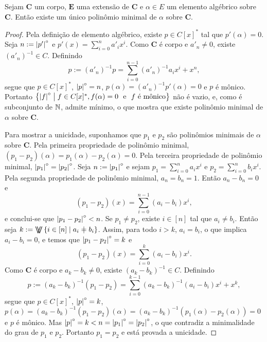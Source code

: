 \begin{proposition}
	Sejam $\bm C$ um corpo, $\bm E$ uma extensão de $\bm C$ e $\alpha \in E$ um elemento algébrico sobre $\bm C$. Então existe um único polinômio minimal de $\alpha$ sobre $\bm C$.
\end{proposition}
\begin{proof}
	Pela definição de elemento algébrico, existe $p \in C[x]^*$ tal que $p'(\alpha)=0$. Seja $n := \left\vert{p'}\right\vert^{\circ}$ e $p'(x) = \sum_{i=0}^n a'_ix^i$. Como $\bm C$ é corpo e $a'_n \neq 0$, existe $(a'_n)^{-1} \in C$. Definindo
	\begin{equation*}
	p := (a'_n)^{-1}p = \sum_{i=0}^{n-1} (a'_n)^{-1}a_ix^i + x^n,
	\end{equation*}
segue que $p \in C[x]^*$, $\left\vert{p}\right\vert^{\circ}=n$, $p(\alpha) = (a'_n)^{-1}p'(\alpha)=0$ e $p$ é mônico. Portanto $\left\{{\left\vert{f}\right\vert^{\circ}}\;\middle\vert\;{f \in C[x]^*, f(\alpha)=0 \text{\ \ e\ \ } f \text{\ é mônico}}\right\}$ não é vazio, e, como é subconjunto de $\mathbb{N}$, admite mínimo, o que mostra que existe polinômio minimal de $\alpha$ sobre $\bm C$.

	Para mostrar a unicidade, suponhamos que $p_1$ e $p_2$ são polinômios minimais de $\alpha$ sobre $\bm C$. Pela primeira propriedade de polinômio minimal, $(p_1-p_2)(\alpha)=p_1(\alpha)-p_2(\alpha)=0$. Pela terceira propriedade de polinômio minimal, $\left\vert{p_1}\right\vert^{\circ}=\left\vert{p_2}\right\vert^{\circ}$. Seja $n := \left\vert{p_1}\right\vert^{\circ}$ e sejam $p_1 = \sum_{i=0}^n a_ix^i$ e $p_2 = \sum_{i=0}^n b_ix^i$. Pela segunda propriedade de polinômio minimal, $a_n=b_n=1$. Então $a_n-b_n=0$ e
	\begin{equation*}
	(p_1-p_2)(x) = \sum_{i=0}^{n-1} (a_i-b_i)x^i,
	\end{equation*}
e conclui-se que $\left\vert{p_1-p_2}\right\vert^{\circ} < n$. Se $p_1 \neq p_2$, existe $i \in [n]$ tal que $a_i \neq b_i$. Então seja $k := \max\set{i \in [n]}{a_i \neq b_i}$. Assim, para todo $i > k$, $a_i = b_i$, o que implica $a_i-b_i=0$, e temos que $\left\vert{p_1-p_2}\right\vert^{\circ}=k$ e
	\begin{equation*}
	(p_1-p_2)(x) = \sum_{i=0}^{k} (a_i-b_i)x^i.
	\end{equation*}
Como $\bm C$ é corpo e $a_k-b_k \neq 0$, existe $(a_k-b_k)^{-1} \in C$. Definindo
	\begin{equation*}
	p := (a_k-b_k)^{-1}(p_1-p_2) = \sum_{i=0}^{k-1} (a_k-b_k)^{-1}(a_i-b_i)x^i + x^k,
	\end{equation*}
 segue que $p \in C[x]^*$, $\left\vert{p}\right\vert^{\circ}=k$, $p(\alpha)=(a_k-b_k)^{-1}(p_1-p_2)(\alpha)=(a_k-b_k)^{-1}(p_1(\alpha)-p_2(\alpha))=0$ e $p$ é mônico. Mas $\left\vert{p}\right\vert^{\circ} = k < n = \left\vert{p_1}\right\vert^{\circ} = \left\vert{p_2}\right\vert^{\circ}$, o que contradiz a minimalidade do grau de $p_1$ e $p_2$. Portanto $p_1=p_2$ e está provada a unicidade.
\end{proof}

